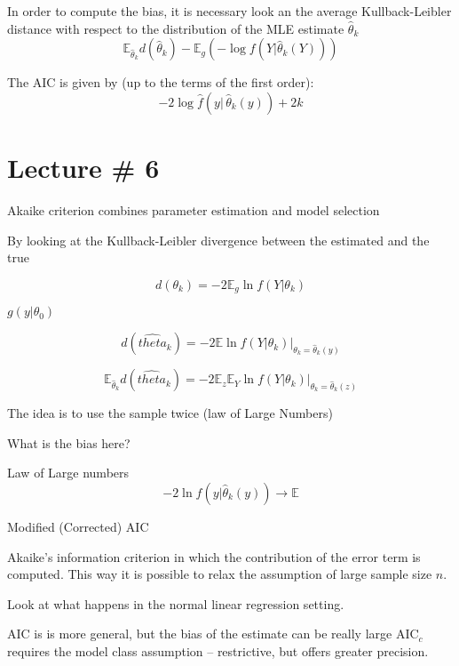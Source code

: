 \documentclass[a4paper]{article}
\newcommand{\brac}[1]{{\left ( #1 \right )}}
\newcommand{\induc}[1]{{\left . #1 \right \vert}}
\newcommand{\Ex}[0]{{\mathbb{E}}}
\begin{document}
In order to compute the bias, it is necessary look an the average Kullback-Leibler distance with respect to the distribution of the MLE estimate $\hat{\theta}_k$
\[\Ex_{\hat{\theta}_k} d(\hat{\theta}_k) - \Ex_g\brac{- \log f\brac{\induc{Y}\hat{\theta}_k(Y)}}\]

The AIC is given by (up to the terms of the first order):
\[-2\log \hat{f}\brac{\induc{y}\,\hat{\theta}_k(y)} + 2k\]




\section{Lecture \# 6} %
\label{sec:lecture_6}

Akaike criterion combines parameter estimation and model selection

By looking at the Kullback-Leibler divergence between the estimated and the true

\[d(\theta_k) = - 2 \Ex_g \ln f\brac{\induc{Y}\theta_k}\]

$g(y\vert \theta_0)$

\[d(\hat{theta}_k) = - 2 \induc{\Ex \ln f\brac{\induc{Y}\theta_k}}_{\theta_k = \hat{\theta}_k(y)}\]

\[\Ex_{\hat{\theta}_k} d(\hat{theta}_k) = - 2 \induc{\Ex_z \Ex_Y \ln f\brac{\induc{Y}\theta_k}}_{\theta_k = \hat{\theta}_k(z)}\]

The idea is to use the sample twice (law of Large Numbers)

What is the bias here?

Law of Large numbers
\[-2 \ln f\brac{\induc{y}\hat{\theta}_k(y)} \to \Ex \]

Modified (Corrected) AIC

Akaike's information criterion in which the contribution of the error term is computed.
This way it is possible to relax the assumption of large sample size $n$.

Look at what happens in the normal linear regression setting.

AIC is is more general, but the bias of the estimate can be really large
$\text{AIC}_c$ requires the model class assumption -- restrictive, but offers greater precision.
\end{document}
